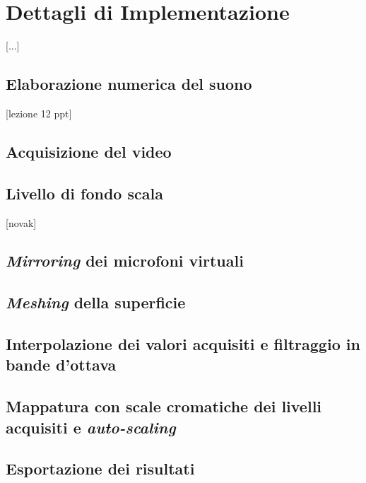 \chapter{Dettagli di Implementazione}
\label{sec:internalfunct}
	\label{sec:impl}
	
	[...]\\
	
	\section{Elaborazione numerica del suono}
	[lezione 12 ppt]\\
	
	\section{Acquisizione del video}
	
	\section{Livello di fondo scala}
	[novak]\\
	
	\section{\emph{Mirroring} dei microfoni virtuali}
	
	\section{\emph{Meshing} della superficie}
	
	\section{Interpolazione dei valori acquisiti e filtraggio in bande d'ottava}
	
	\section{Mappatura con scale cromatiche dei livelli acquisiti e \emph{auto-scaling}}
	
	\section{Esportazione dei risultati}
	


